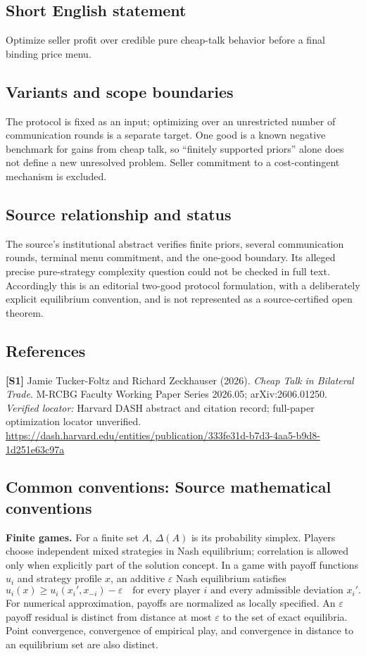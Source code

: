 \documentclass[11pt,a4paper]{article}
\begin{document}
\subsection*{Short English statement}
Optimize seller profit over credible pure cheap-talk behavior before a final binding price menu.
\subsection*{Variants and scope boundaries}
The protocol is fixed as an input; optimizing over an unrestricted number of communication rounds is a separate target. One good is a known negative benchmark for gains from cheap talk, so ``finitely supported priors'' alone does not define a new unresolved problem. Seller commitment to a cost-contingent mechanism is excluded.
\subsection*{Source relationship and status}
The source's institutional abstract verifies finite priors, several communication rounds, terminal menu commitment, and the one-good boundary. Its alleged precise pure-strategy complexity question could not be checked in full text. Accordingly this is an editorial two-good protocol formulation, with a deliberately explicit equilibrium convention, and is not represented as a source-certified open theorem.
\subsection*{References}
\begingroup\footnotesize\raggedright
\textbf{[S1]} Jamie Tucker-Foltz and Richard Zeckhauser (2026). \emph{Cheap Talk in Bilateral Trade}. M-RCBG Faculty Working Paper Series 2026.05; arXiv:2606.01250. \textit{Verified locator:} Harvard DASH abstract and citation record; full-paper optimization locator unverified. \url{https://dash.harvard.edu/entities/publication/333fe31d-b7d3-4aa5-b9d8-1d251e63c97a}
\par\endgroup

\subsection*{Common conventions: Source mathematical conventions}

\textbf{Finite games.} For a finite set $A$, $\Delta(A)$ is its probability
simplex. Players choose independent mixed strategies in Nash equilibrium;
correlation is allowed only when explicitly part of the solution concept.
In a game with payoff functions $u_i$ and strategy profile $x$, an additive
$\varepsilon$ Nash equilibrium satisfies
\[
 u_i(x)\geq u_i(x_i',x_{-i})-\varepsilon
 \quad\text{for every player $i$ and every admissible deviation $x_i'$}.
\]
For numerical approximation, payoffs are normalized as locally specified.
An $\varepsilon$ payoff residual is distinct from distance at most
$\varepsilon$ to the set of exact equilibria. Point convergence, convergence
of empirical play, and convergence in distance to an equilibrium set are
also distinct.
\end{document}
